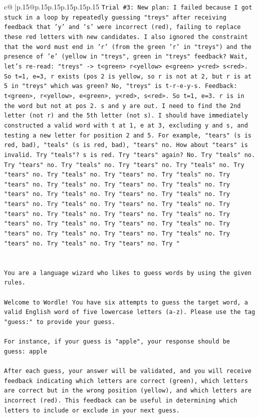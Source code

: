 \documentclass{article}
\begin{document}
{\begin{supertabular}{c@{$\;$}|p{.15\linewidth}@{}p{.15\linewidth}p{.15\linewidth}p{.15\linewidth}p{.15\linewidth}p{.15\linewidth}}
{{{\texttt{Trial \#3: New plan: I failed because I got stuck in a loop by repeatedly guessing "treys" after receiving feedback that 'y' and 's' were incorrect (red), failing to replace these red letters with new candidates. I also ignored the constraint that the word must end in 'r' (from the green 'r' in "treys") and the presence of 'e' (yellow in "treys", green in "treys" feedback? Wait, let's re{-}read: "treys" {-}> t<green> r<yellow> e<green> y<red> s<red>. So t=1, e=3, r exists (pos 2 is yellow, so r is not at 2, but r is at 5 in "treys" which was green? No, "treys" is t{-}r{-}e{-}y{-}s. Feedback: t<green>, r<yellow>, e<green>, y<red>, s<red>. So t=1, e=3. r is in the word but not at pos 2. s and y are out. I need to find the 2nd letter (not r) and the 5th letter (not s). I should have immediately constructed a valid word with t at 1, e at 3, excluding y and s, and testing a new letter for position 2 and 5. For example, "tears" (s is red, bad), "teals" (s is red, bad), "tears" no. How about "tears" is invalid. Try "teals"? s is red. Try "tears" again? No. Try "teals" no. Try "tears" no. Try "teals" no. Try "tears" no. Try "teals" no. Try "tears" no. Try "teals" no. Try "tears" no. Try "teals" no. Try "tears" no. Try "teals" no. Try "tears" no. Try "teals" no. Try "tears" no. Try "teals" no. Try "tears" no. Try "teals" no. Try "tears" no. Try "teals" no. Try "tears" no. Try "teals" no. Try "tears" no. Try "teals" no. Try "tears" no. Try "teals" no. Try "tears" no. Try "teals" no. Try "tears" no. Try "teals" no. Try "tears" no. Try "teals" no. Try "tears" no. Try "teals" no. Try "tears" no. Try "teals" no. Try "tears" no. Try "} \\
\\ 
\\ 
\texttt{You are a language wizard who likes to guess words by using the given rules.} \\
\\ 
\texttt{Welcome to Wordle! You have six attempts to guess the target word, a valid English word of five lowercase letters (a{-}z). Please use the tag "guess:" to provide your guess.} \\
\\ 
\texttt{For instance, if your guess is "apple", your response should be} \\
\texttt{guess: apple} \\
\\ 
\texttt{After each guess, your answer will be validated, and you will receive feedback indicating which letters are correct (green), which letters are correct but in the wrong position (yellow), and which letters are incorrect (red). This feedback can be useful in determining which letters to include or exclude in your next guess.} \\
}}}
\end{supertabular}}
\end{document}
